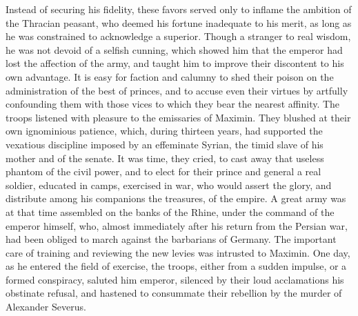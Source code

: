

Instead of securing his fidelity, these favors served only to
inflame the ambition of the Thracian peasant, who deemed his
fortune inadequate to his merit, as long as he was constrained to
acknowledge a superior. Though a stranger to real wisdom, he was
not devoid of a selfish cunning, which showed him that the
emperor had lost the affection of the army, and taught him to
improve their discontent to his own advantage. It is easy for
faction and calumny to shed their poison on the administration of
the best of princes, and to accuse even their virtues by artfully
confounding them with those vices to which they bear the nearest
affinity. The troops listened with pleasure to the emissaries of
Maximin. They blushed at their own ignominious patience, which,
during thirteen years, had supported the vexatious discipline
imposed by an effeminate Syrian, the timid slave of his mother
and of the senate. It was time, they cried, to cast away that
useless phantom of the civil power, and to elect for their prince
and general a real soldier, educated in camps, exercised in war,
who would assert the glory, and distribute among his companions
the treasures, of the empire. A great army was at that time
assembled on the banks of the Rhine, under the command of the
emperor himself, who, almost immediately after his return from
the Persian war, had been obliged to march against the barbarians
of Germany. The important care of training and reviewing the new
levies was intrusted to Maximin. One day, as he entered the field
of exercise, the troops, either from a sudden impulse, or a
formed conspiracy, saluted him emperor, silenced by their loud
acclamations his obstinate refusal, and hastened to consummate
their rebellion by the murder of Alexander Severus.


